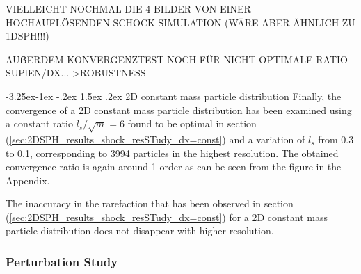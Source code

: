 \documentclass{report}
\makeatletter
\renewcommand\paragraph{\@startsection{paragraph}{4}{\z@}%
  {-3.25ex\@plus -1ex \@minus -.2ex}%
  {1.5ex \@plus .2ex}%
  {\normalfont\normalsize\bfseries}}
\makeatother
\begin{document}
VIELLEICHT NOCHMAL DIE 4 BILDER VON EINER HOCHAUFLÖSENDEN SCHOCK-SIMULATION (WÄRE ABER ÄHNLICH ZU 1DSPH!!!)

AUẞERDEM KONVERGENZTEST NOCH FÜR NICHT-OPTIMALE RATIO SUPlEN/DX...->ROBUSTNESS


\paragraph{2D constant mass particle distribution}
Finally, the convergence of a 2D constant mass particle distribution has been examined using a constant ratio $l_s/\sqrt{m}=6$ found to be optimal in section (\ref{sec:2DSPH_results_shock_resSTudy_dx=const}) and a variation of $l_s$ from 0.3 to 0.1, corresponding to 3994 particles in the highest resolution.
The obtained convergence ratio is again around 1 order as can be seen from the figure in the Appendix. 

The inaccuracy in the rarefaction that has been observed in section (\ref{sec:2DSPH_results_shock_resSTudy_dx=const}) for a 2D constant mass particle distribution does not disappear with higher resolution. 
 

\subsubsection{Perturbation Study}
\end{document}
